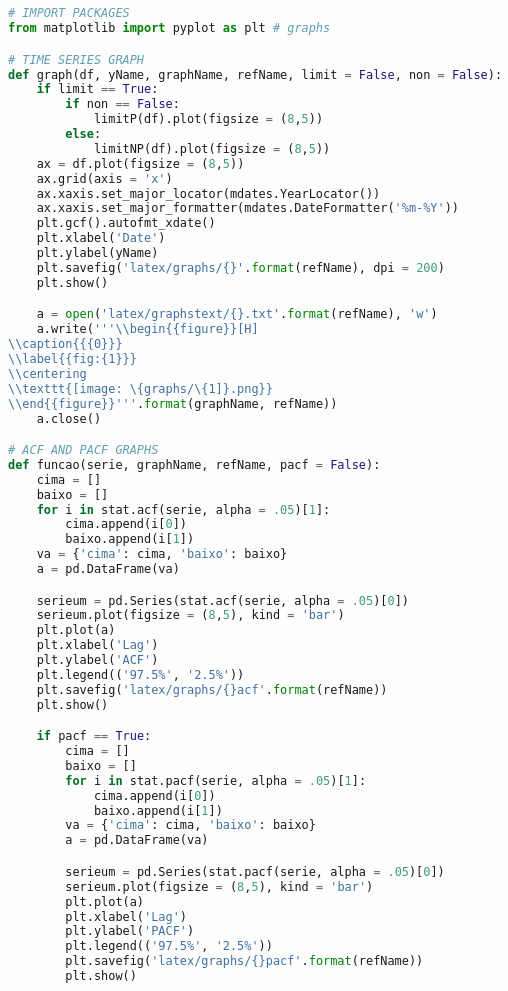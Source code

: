 \begin{lstlisting}[language=Python]


# IMPORT PACKAGES
from matplotlib import pyplot as plt # graphs

# TIME SERIES GRAPH
def graph(df, yName, graphName, refName, limit = False, non = False):
    if limit == True:
        if non == False:
            limitP(df).plot(figsize = (8,5))
        else:
            limitNP(df).plot(figsize = (8,5))
    ax = df.plot(figsize = (8,5))
    ax.grid(axis = 'x')
    ax.xaxis.set_major_locator(mdates.YearLocator())
    ax.xaxis.set_major_formatter(mdates.DateFormatter('%m-%Y'))
    plt.gcf().autofmt_xdate()
    plt.xlabel('Date')
    plt.ylabel(yName)
    plt.savefig('latex/graphs/{}'.format(refName), dpi = 200)
    plt.show()

    a = open('latex/graphstext/{}.txt'.format(refName), 'w')
    a.write('''\\begin{{figure}}[H]
\\caption{{{0}}}
\\label{{fig:{1}}}
\\centering
\\texttt{[image: \{graphs/\{1]}.png}}
\\end{{figure}}'''.format(graphName, refName))
    a.close()  

# ACF AND PACF GRAPHS
def funcao(serie, graphName, refName, pacf = False):
    cima = []
    baixo = []
    for i in stat.acf(serie, alpha = .05)[1]:
        cima.append(i[0])
        baixo.append(i[1])
    va = {'cima': cima, 'baixo': baixo}
    a = pd.DataFrame(va)

    serieum = pd.Series(stat.acf(serie, alpha = .05)[0])
    serieum.plot(figsize = (8,5), kind = 'bar')
    plt.plot(a)
    plt.xlabel('Lag')
    plt.ylabel('ACF')
    plt.legend(('97.5%', '2.5%'))
    plt.savefig('latex/graphs/{}acf'.format(refName))
    plt.show()

    if pacf == True:
        cima = []
        baixo = []
        for i in stat.pacf(serie, alpha = .05)[1]:
            cima.append(i[0])
            baixo.append(i[1])
        va = {'cima': cima, 'baixo': baixo}
        a = pd.DataFrame(va)

        serieum = pd.Series(stat.pacf(serie, alpha = .05)[0])
        serieum.plot(figsize = (8,5), kind = 'bar')
        plt.plot(a)
        plt.xlabel('Lag')
        plt.ylabel('PACF')
        plt.legend(('97.5%', '2.5%'))
        plt.savefig('latex/graphs/{}pacf'.format(refName))
        plt.show()
    

\end{lstlisting}
